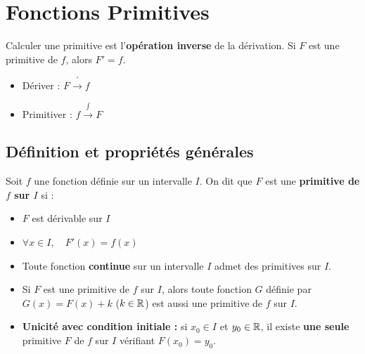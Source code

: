 
\chapter{Fonctions Primitives}

\begin{rappel}
  Calculer une primitive est l'\textbf{op\'{e}ration inverse} de la d\'{e}rivation.
  Si $F$ est une primitive de $f$, alors $F' = f$.
  \begin{itemize}
    \item D\'{e}river : $F \xrightarrow{\ '\ } f$
    \item Primitiver : $f \xrightarrow{\int} F$
  \end{itemize}
\end{rappel}

\section{D\'{e}finition et propri\'{e}t\'{e}s g\'{e}n\'{e}rales}

\begin{definition}
  Soit $f$ une fonction d\'{e}finie sur un intervalle $I$.
  On dit que $F$ est une \textbf{primitive de $f$ sur $I$} si :
  \begin{itemize}
    \item $F$ est d\'{e}rivable sur $I$
    \item $\forall x \in I, \quad F'(x) = f(x)$
  \end{itemize}
\end{definition}

\begin{theoreme}
  \begin{itemize}
    \item Toute fonction \textbf{continue} sur un intervalle $I$ admet
          des primitives sur $I$.
    \item Si $F$ est une primitive de $f$ sur $I$, alors toute fonction
          $G$ d\'{e}finie par $G(x) = F(x) + k$ \; ($k \in \mathbb{R}$) est aussi
          une primitive de $f$ sur $I$.
    \item \textbf{Unicit\'{e} avec condition initiale :} si $x_0 \in I$ et
          $y_0 \in \mathbb{R}$, il existe \textbf{une seule} primitive $F$ de $f$ sur $I$
          v\'{e}rifiant $F(x_0) = y_0$.
  \end{itemize}
\end{theoreme}

